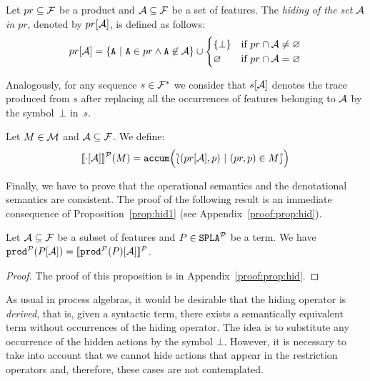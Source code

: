 \bdfn
  Let $pr\subseteq{\cal F}$ be a product and ${\cal A}\subseteq{\cal F}$
  be a set of features. The \emph{hiding of the set ${\cal A}$
    in $pr$}, denoted by $pr[{\cal A}]$, is defined as follows:
  \begin{displaymath}
    pr\hide{\calA} = \{\fA\ |\ \fA\in pr\wedge
    \fA\not\in\calA\}\cup
    \begin{cases}
      \{\bot\} & \mbox{if } pr\cap\calA\neq\emptyset\\
      \emptyset & \mbox{if } pr\cap\calA=\emptyset\\
    \end{cases}
  \end{displaymath}

  Analogously, for any sequence $s\in{\cal F}^{*}$ we consider that $s[{\cal A}]$ denotes the
  trace produced from $s$ after replacing all the occurrences of features belonging to ${\cal A}$ by the symbol~$\bot$ in~$s$.
\edfn

\bdfn
  Let $M\in{\cal M}$ and ${\cal A}\subseteq{\cal F}$. We define:
  \begin{displaymath}
    [\![\cdot[{\cal A}]]\!]^{\cal P}(M) = \mathtt{accum}\Bigl(\lbag(pr[{\cal A}],p)\
    |\ (pr,p)\in M\rbag \Bigr)
  \end{displaymath}
\edfn

Finally, we have to prove that the
operational semantics and the denotational semantics are consistent.
%
The proof of the following result is an immediate consequence of Proposition~\ref{prop:hid1} (see Appendix~\ref{proof:prop:hid}).

\bprop\label{prop:hid}Let ${\cal A}\subseteq {\cal F}$ be a subset of features and
  $P\in\mathtt{SPLA{^{\cal P}}}$ be a term. We have $ \mathtt{prod}^{\cal P}(P[{\cal A}])  =
  [\![\mathtt{prod}^{\cal P}(P)[{\cal A}]]\!]^{\cal P}$.
  \begin{proof}
    The proof of this proposition is in Appendix~\ref{proof:prop:hid}.
  \end{proof}
\eprop

As usual in process algebras, it would be desirable that the hiding operator is \emph{derived}, that is, given a syntactic term, there exists a semantically equivalent term without occurrences of the hiding operator.
The idea is to substitute any occurrence of
the hidden actions by the symbol $\bot$. However, it is necessary to take into account  that we cannot
hide actions that appear in the restriction operators and, therefore, these cases are not contemplated.

